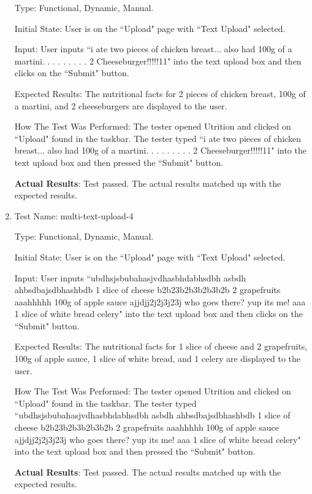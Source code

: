 \documentclass[12pt, titlepage]{article}
\begin{document}
\begin{enumerate}
		Type: Functional, Dynamic, Manual.
		
		Initial State: User is on the ``Upload" page with ``Text Upload" selected.
		
		Input: User inputs ``i ate two pieces of chicken breast... also had 100g of a martini. . . . . . . . . 2 Cheeseburger!!!!!11" into the text upload box and then clicks on the ``Submit" button.
		
		Expected Results: The nutritional facts for 2 pieces of chicken breast, 100g of a martini, and 2 cheeseburgers are displayed to the user.
		
		How The Test Was Performed: The tester opened Utrition and clicked on ``Upload" found in the taskbar. The tester typed ``i ate two pieces of chicken breast... also had 100g of a martini. . . . . . . . . 2 Cheeseburger!!!!!11" into the text upload box and then pressed the ``Submit" button.
		
		\textbf{Actual Results}: Test passed. The actual results matched up with the expected results.
		
		\item{Test Name: multi-text-upload-4}
		
		Type: Functional, Dynamic, Manual.
		
		Initial State: User is on the ``Upload" page with ``Text Upload" selected.
		
		Input: User inputs ``ubdhsjsbubahasjvdhasbhdabhsdbh asbdh ahbsdbajsdbhashbdb 1 slice of cheese b2b23b2b3b2b3b2b 2 grapefruits aaahhhhh 100g of apple sauce ajjdjj2j2j3j23j who goes there? yup its me! aaa 1 slice of white bread celery" into the text upload box and then clicks on the ``Submit" button.
		
		Expected Results: The nutritional facts for 1 slice of cheese and 2 grapefruits, 100g of apple sauce, 1 slice of white bread, and 1 celery are displayed to the user.
		
		How The Test Was Performed: The tester opened Utrition and clicked on ``Upload" found in the taskbar. The tester typed ``ubdhsjsbubahasjvdhasbhdabhsdbh asbdh ahbsdbajsdbhashbdb 1 slice of cheese b2b23b2b3b2b3b2b 2 grapefruits aaahhhhh 100g of apple sauce ajjdjj2j2j3j23j who goes there? yup its me! aaa 1 slice of white bread celery" into the text upload box and then pressed the ``Submit" button.
		
		\textbf{Actual Results}: Test passed. The actual results matched up with the expected results.
		
	\end{enumerate}
\end{document}
